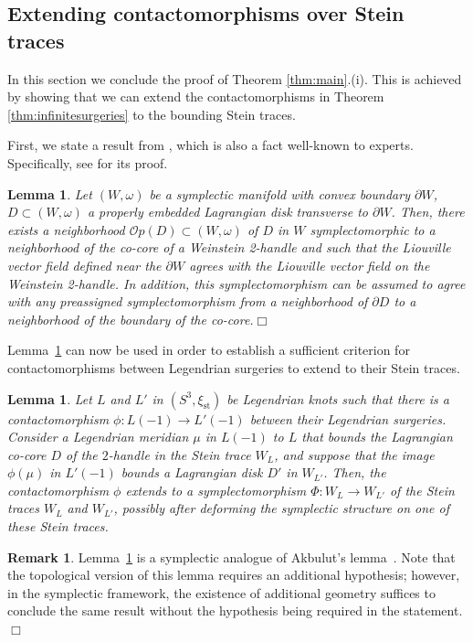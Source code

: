 \documentclass[11pt]{amsart} %
\newcommand{\Op}{{\mathcal{O}} p}
\newcommand{\xist}{\xi_{\mathrm{st}}}
\theoremstyle{plain}
\newtheorem{lem}[Theorem]{Lemma}
\theoremstyle{definition}
\newtheorem{rem}[Theorem]{Remark}
\begin{document}
\subsection{Extending contactomorphisms over Stein traces}\label{strace}
In this section we conclude the proof of Theorem \ref{thm:main}.(i). This is achieved by showing that we can extend the contactomorphisms in Theorem \ref{thm:infinitesurgeries} to the bounding Stein traces.

First, we state a result from \cite{ConwayEtnyreTosun21}, which is also a fact well-known to experts. Specifically, see \cite[Lemma~3.3]{ConwayEtnyreTosun21} for its proof.

\begin{lem}\label{nbhdoflagrangiandisk}
	Let $(W,\omega)$ be a symplectic manifold with convex boundary $\partial W$, $D \subset (W,\omega)$ a properly embedded Lagrangian disk transverse to $\partial W$. Then, there exists a neighborhood $\Op(D)\subset(W,\omega)$ of $D$ in $W$ symplectomorphic to a neighborhood of the co-core of a Weinstein 2-handle and such that the Liouville vector field defined near the $\partial W$ agrees with the Liouville vector field on the Weinstein 2-handle. In addition, this symplectomorphism can be assumed to agree with any preassigned symplectomorphism from a neighborhood of $\partial D$ to a neighborhood of the boundary of the co-core.\hfill$\Box$
\end{lem}

Lemma~\ref{nbhdoflagrangiandisk} can now be used in order to establish a sufficient criterion for contactomorphisms between Legendrian surgeries to extend to their Stein traces.

\begin{lem}\label{extend}
Let $L$ and $L'$ in $(S^3,\xist)$ be Legendrian knots such that there is a contactomorphism $\phi:L(-1)\longrightarrow L'(-1)$ between their Legendrian surgeries. Consider a Legendrian meridian $\mu$ in $L(-1)$ to $L$ that bounds the Lagrangian co-core $D$ of the $2$-handle in the Stein trace $W_L$, and suppose that the image $\phi(\mu)$ in $L'(-1)$ bounds a Lagrangian disk $D'$ in $W_{L'}$. Then, the contactomorphism $\phi$ extends to a symplectomorphism $\Phi:W_L\longrightarrow W_{L'}$ of the Stein traces $W_L$ and $W_{L'}$, possibly after deforming the symplectic structure on one of these Stein traces.
\end{lem}

\begin{rem}\label{rem:akbulut}
Lemma~\ref{extend} is a symplectic analogue of Akbulut's lemma~\cite{Akbulut77}. Note that the topological version of this lemma requires an additional hypothesis; however, in the symplectic framework, the existence of additional geometry suffices to conclude the same result without the hypothesis being required in the statement.\hfill$\Box$
\end{rem}
\end{document}
